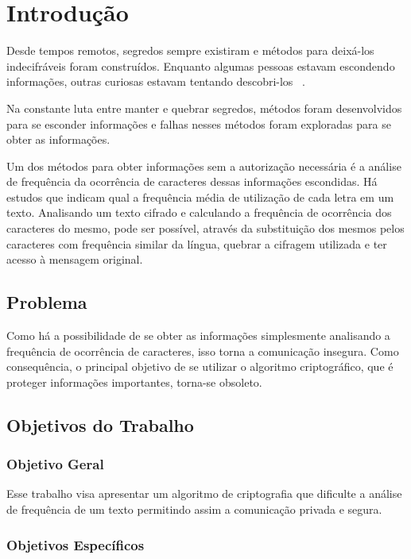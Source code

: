 \chapter{Introdução}
\label{introduction}

Desde tempos remotos, segredos sempre existiram e métodos para deixá-los indecifráveis foram construídos. Enquanto algumas pessoas estavam escondendo informações, outras curiosas estavam tentando descobri-los ~\cite{alexander-maximov}. %

Na constante luta entre manter e quebrar segredos, métodos foram desenvolvidos para se esconder informações e falhas nesses métodos foram exploradas para se obter as informações. 

Um dos métodos para obter informações sem a autorização necessária é a análise de frequência da ocorrência de caracteres dessas informações escondidas. Há estudos que indicam qual a frequência média de utilização de cada letra em um texto. Analisando um texto cifrado e calculando a frequência de ocorrência dos caracteres do mesmo, pode ser possível, através da substituição dos mesmos pelos caracteres com frequência similar da língua, quebrar a cifragem utilizada e ter acesso à mensagem original.

\section{Problema}

Como há a possibilidade de se obter as informações simplesmente analisando a frequência de ocorrência de caracteres, isso torna a comunicação insegura. Como consequência, o principal objetivo de se utilizar o algoritmo criptográfico, que é proteger informações importantes, torna-se obsoleto.  

\section{Objetivos do Trabalho}
\label{paper-objectives}

\subsection{Objetivo Geral}
\label{general-objective}
Esse trabalho visa apresentar um algoritmo de criptografia que dificulte a análise de frequência de um texto permitindo assim a comunicação privada e segura.

\subsection{Objetivos Específicos}
\label{specifics-objectives}


